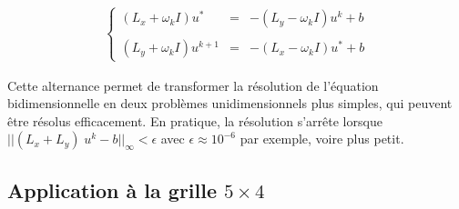 \documentclass{article}
\begin{document}
 \begin{eqnarray}\left\{ 
\begin{array}{lcl}
  (L_x+\omega_k I) u^* &=& -(L_y-\omega_k I) u^k +b \\
  \\
 (L_y+\omega_k I) u^{k+1} &=& -(L_x-\omega_k I) u^* +b \end{array} \right. 
  \label{ADI}
  \end{eqnarray}
  
Cette alternance permet de transformer la résolution de l'équation bidimensionnelle en deux problèmes unidimensionnels plus simples, qui peuvent être résolus efficacement.
En pratique, la résolution s'arrête lorsque  $||(L_x+L_y) \; u^k -b||_\infty < \epsilon$ avec $\epsilon \approx 10^{-6}$
par exemple, voire plus petit.

 \subsection{Application à la grille $5 \times 4$}
 
\end{document}
